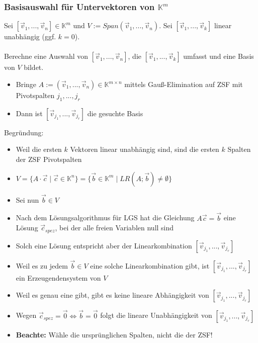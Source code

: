 \documentclass[titlepage]{article}
\newcommand{\K}{\mathbb{K}}
\newcommand{\1}{\mathbb{1}}
\newcommand{\0}{\mathbb{0}}
\begin{document}
				\subsubsection{Basisauswahl für Untervektoren von $\mathbb{K}^m$}
					Sei $[\vec{v}_1,...,\vec{v}_n]\in\K^m$ und $V:=Span(\vec{v}_1,...,\vec{v}_n)$. Sei $[\vec{v}_1,...,\vec{v}_k]$ linear unabhängig (ggf. $k=0$).\\\\Berechne eine Auswahl von $[\vec{v}_1,...,\vec{v}_n]$, die $[\vec{v}_1,...,\vec{v}_k]$ umfasst und eine Basis von $V$ bildet.
					\begin{itemize}
						\item Bringe $A:=(\vec{v}_1,...,\vec{v}_n)\in\K^{m\times n}$ mittels Gauß-Elimination auf ZSF mit Pivotspalten $j_1,...,j_r$
						\item Dann ist $[\vec{v}_{j_1},...,\vec{v}_{j_r}]$ die gesuchte Basis
					\end{itemize}
					Begründung:
					\begin{itemize}
						\item Weil die ersten $k$ Vektoren linear unabhängig sind, sind die ersten $k$ Spalten der ZSF Pivotspalten
						\item $V=\{A\cdot\vec{c}\mid\vec{c}\in\K^n\}=\{\vec{b}\in\K^m\mid LR(A;\vec{b})\neq\emptyset\}$
						\item Sei nun $\vec{b}\in V$
						\item Nach dem Lösungsalgorithmus für LGS hat die Gleichung $A\vec{c}=\vec{b}$ eine Lösung $\vec{c}_{spez}$, bei der alle freien Variablen null sind
						\item Solch eine Lösung entspricht aber der Linearkombination $[\vec{v}_{j_1},...,\vec{v}_{j_r}]$
						\item Weil es zu jedem $\vec{b}\in V$ eine solche Linearkombination gibt, ist $[\vec{v}_{j_1},...,\vec{v}_{j_r}]$ ein Erzeugendensystem von $V$
						\item Weil es genau eine gibt, gibt es keine lineare Abhängigkeit von $[\vec{v}_{j_1},...,\vec{v}_{j_r}]$
						\item Wegen $\vec{c}_{spez}=\vec{0}\Longleftrightarrow\vec{b}=\vec{0}$ folgt die lineare Unabhängigkeit von $[\vec{v}_{j_1},...,\vec{v}_{j_r}]$
						\item \textbf{Beachte:} Wähle die ursprünglichen Spalten, nicht die der ZSF!
					\end{itemize}
\end{document}
